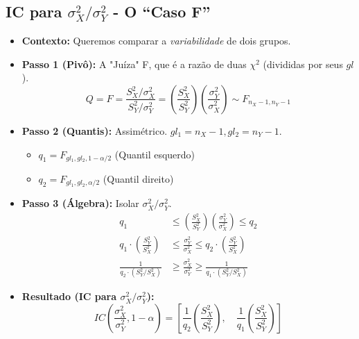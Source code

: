 \documentclass[12pt, a4paper]{article}
\theoremstyle{definition} %
\theoremstyle{remark} %
\begin{document}
\subsection{\texorpdfstring{IC para $\sigma_X^2 / \sigma_Y^2$ - O ``Caso F''}{IC para sigma_X^2 / sigma_Y^2 - O ``Caso F''}}
\begin{itemize}
    \item \textbf{Contexto:} Queremos comparar a \textit{variabilidade} de dois grupos.
    \item \textbf{Passo 1 (Pivô):} A "Juíza" F, que é a razão de duas $\chi^2$ (divididas por seus $gl$).
        $$ Q = F = \frac{S_X^2 / \sigma_X^2}{S_Y^2 / \sigma_Y^2} = \left(\frac{S_X^2}{S_Y^2}\right) \left(\frac{\sigma_Y^2}{\sigma_X^2}\right) \sim F_{n_X-1, n_Y-1} $$
    \item \textbf{Passo 2 (Quantis):} Assimétrico. $gl_1 = n_X-1, gl_2 = n_Y-1$.
        \begin{itemize}
            \item $q_1 = F_{gl_1, gl_2, 1-\alpha/2}$ (Quantil esquerdo)
            \item $q_2 = F_{gl_1, gl_2, \alpha/2}$ (Quantil direito)
        \end{itemize}
    \item \textbf{Passo 3 (Álgebra):} Isolar $\sigma_X^2 / \sigma_Y^2$.
    \begin{align*}
        q_1 &\le \left(\frac{S_X^2}{S_Y^2}\right) \left(\frac{\sigma_Y^2}{\sigma_X^2}\right) \le q_2 \\
        q_1 \cdot \left(\frac{S_Y^2}{S_X^2}\right) &\le \frac{\sigma_Y^2}{\sigma_X^2} \le q_2 \cdot \left(\frac{S_Y^2}{S_X^2}\right) \\
        \frac{1}{q_2 \cdot (S_Y^2/S_X^2)} &\ge \frac{\sigma_X^2}{\sigma_Y^2} \ge \frac{1}{q_1 \cdot (S_Y^2/S_X^2)}
    \end{align*}
    \item \textbf{Resultado (IC para $\sigma_X^2 / \sigma_Y^2$):}
        $$ IC\left(\frac{\sigma_X^2}{\sigma_Y^2}, 1-\alpha\right) = \left[ \frac{1}{q_2} \left(\frac{S_X^2}{S_Y^2}\right), \quad \frac{1}{q_1} \left(\frac{S_X^2}{S_Y^2}\right) \right] $$
\end{itemize}
\end{document}
